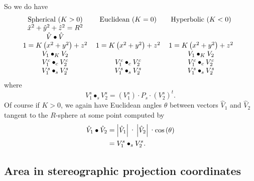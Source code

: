\documentclass{article}%
\begin{document}
So we do have%
\[%
\begin{tabular}
[c]{ccc}%
Spherical ($K>0$) & Euclidean ($K=0$) & Hyperbolic ($K<0$)\\
$\hat{x}^{2}+\hat{y}^{2}+\hat{z}^{2}=R^{2}$ &  & \\
$\hat{V}\bullet\hat{V}$ &  & \\
$1=K\left(  x^{2}+y^{2}\right)  +z^{2}$ & $1=K\left(  x^{2}+y^{2}\right)
+z^{2}$ & $1=K\left(  x^{2}+y^{2}\right)  +z^{2}$\\
$V_{1}\bullet_{K}V_{2}$ &  & $V_{1}\bullet_{K}V_{2}$\\
$V_{1}^{c}\bullet_{c}V_{2}^{c}$ & $V_{1}^{c}\bullet_{c}V_{2}^{c}$ & $V_{1}%
^{c}\bullet_{c}V_{2}^{c}$\\
$V_{1}^{s}\bullet_{s}V_{2}^{s}$ & $V_{1}^{s}\bullet_{s}V_{2}^{s}$ & $V_{1}%
^{s}\bullet_{s}V_{2}^{s}$%
\end{tabular}
\ \
\]
where%
\[
V_{1}^{s}\bullet_{s}V_{2}^{s}=\left(  V_{1}^{s}\right)  \cdot P_{s}%
\cdot\left(  V_{2}^{s}\right)  ^{t}.
\]
Of course if $K>0$, we again have Euclidean angles $\theta$ between vectors
$\hat{V}_{1}$ and $\hat{V}_{2}$ tangent to the $R$-sphere at some point
computed by%
\begin{align*}
\hat{V}_{1}\bullet\hat{V}_{2}  &  =\left\vert \hat{V}_{1}\right\vert
\text{\textperiodcentered}\left\vert \hat{V}_{2}\right\vert
\text{\textperiodcentered\textrm{cos}}\left(  \theta\right) \\
&  =V_{1}^{s}\bullet_{s}V_{2}^{s}.
\end{align*}
\pagebreak

\subsection{Area in stereographic projection coordinates}
\end{document}
